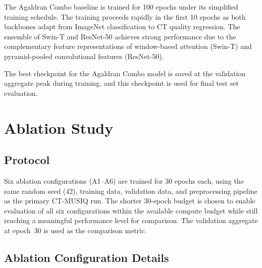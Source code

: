 The Agaldran Combo baseline is trained for 100 epochs under its simplified training
schedule. The training proceeds rapidly in the first 10 epochs as both backbones
adapt from ImageNet classification to CT quality regression. The ensemble of Swin-T
and ResNet-50 achieves strong performance due to the complementary feature representations
of window-based attention (Swin-T) and pyramid-pooled convolutional features (ResNet-50).

The best checkpoint for the Agaldran Combo model is saved at the validation aggregate
peak during training, and this checkpoint is used for final test set evaluation.


\section{Ablation Study}
\label{sec:exp_ablation}

\subsection{Protocol}

Six ablation configurations (A1--A6) are trained for 30 epochs each, using the same
random seed (42), training data, validation data, and preprocessing pipeline as the
primary CT-MUSIQ run. The shorter 30-epoch budget is chosen to enable evaluation of
all six configurations within the available compute budget while still reaching a
meaningful performance level for comparison. The validation aggregate at epoch~30 is
used as the comparison metric.

\subsection{Ablation Configuration Details}

